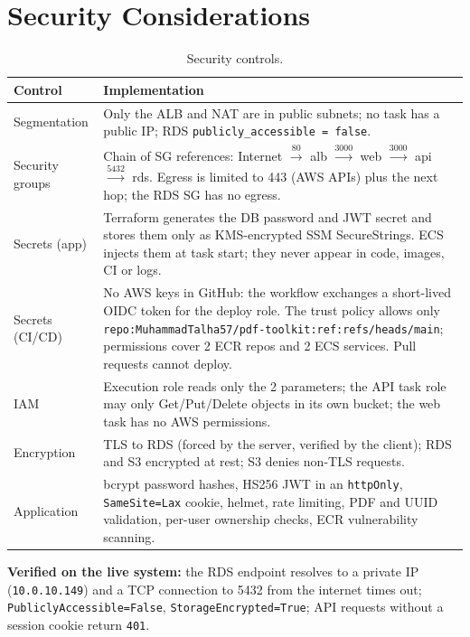 \documentclass[11pt,a4paper]{article}
\begin{document}
\section{Security Considerations}
\begin{table}[H]
\centering\footnotesize
\begin{tabularx}{\textwidth}{L{2.6cm}X}
\toprule
\textbf{Control} & \textbf{Implementation}\\
\midrule
Segmentation & Only the ALB and NAT are in public subnets; no task has a public IP; RDS \texttt{publicly\_accessible = false}.\\
Security groups & Chain of SG references: Internet $\xrightarrow{80}$ alb $\xrightarrow{3000}$ web $\xrightarrow{3000}$ api $\xrightarrow{5432}$ rds. Egress is limited to 443 (AWS APIs) plus the next hop; the RDS SG has no egress.\\
Secrets (app) & Terraform generates the DB password and JWT secret and stores them only as KMS-encrypted SSM SecureStrings. ECS injects them at task start; they never appear in code, images, CI or logs.\\
Secrets (CI/CD) & No AWS keys in GitHub: the workflow exchanges a short-lived OIDC token for the deploy role. The trust policy allows only \texttt{repo:MuhammadTalha57/pdf-toolkit:ref:refs/heads/main}; permissions cover 2 ECR repos and 2 ECS services. Pull requests cannot deploy.\\
IAM & Execution role reads only the 2 parameters; the API task role may only Get/Put/Delete objects in its own bucket; the web task has no AWS permissions.\\
Encryption & TLS to RDS (forced by the server, verified by the client); RDS and S3 encrypted at rest; S3 denies non-TLS requests.\\
Application & bcrypt password hashes, HS256 JWT in an \texttt{httpOnly}, \texttt{SameSite=Lax} cookie, helmet, rate limiting, PDF and UUID validation, per-user ownership checks, ECR vulnerability scanning.\\
\bottomrule
\end{tabularx}
\caption{Security controls.}
\end{table}
\textbf{Verified on the live system:} the RDS endpoint resolves to a private IP
(\texttt{10.0.10.149}) and a TCP connection to 5432 from the internet times
out; \texttt{PubliclyAccessible=False}, \texttt{StorageEncrypted=True};
API requests without a session cookie return \texttt{401}.
\end{document}
